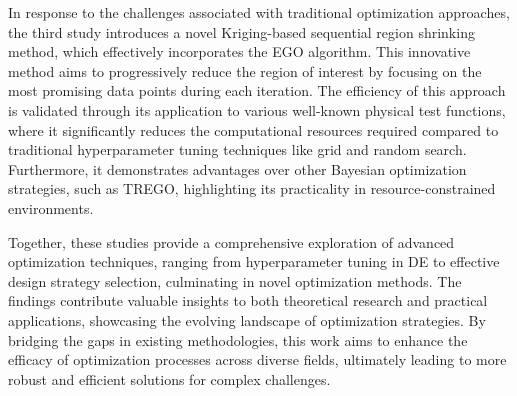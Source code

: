 In response to the challenges associated with traditional optimization approaches, the third study introduces a novel Kriging-based sequential region shrinking method, which effectively incorporates the EGO algorithm. This innovative method aims to progressively reduce the region of interest by focusing on the most promising data points during each iteration. The efficiency of this approach is validated through its application to various well-known physical test functions, where it significantly reduces the computational resources required compared to traditional hyperparameter tuning techniques like grid and random search. Furthermore, it demonstrates advantages over other Bayesian optimization strategies, such as TREGO, highlighting its practicality in resource-constrained environments.

Together, these studies provide a comprehensive exploration of advanced optimization techniques, ranging from hyperparameter tuning in DE to effective design strategy selection, culminating in novel optimization methods. The findings contribute valuable insights to both theoretical research and practical applications, showcasing the evolving landscape of optimization strategies. By bridging the gaps in existing methodologies, this work aims to enhance the efficacy of optimization processes across diverse fields, ultimately leading to more robust and efficient solutions for complex challenges.

